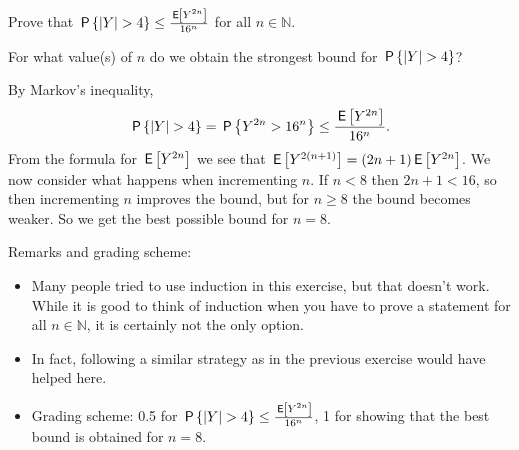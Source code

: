 \begin{exercise}[1.5]
Prove that $\P{|Y| > 4} \leq \frac{\E{Y^{2n}}}{16^n}$ for all $n \in \mathbb N$. 

For what value(s) of $n$ do we obtain the strongest bound for $\P{|Y| > 4}$?  \\
\begin{solution}
 By Markov's inequality,
\begin{equation*}
\P{|Y| > 4} = \P{Y^{2n} > 16^n} \leq \frac{\E{Y^{2n}}}{16^n}.
\end{equation*}
From the formula for $\E{Y^{2n}}$ we see that $\E{Y^{2(n+1)}} = (2n+1)\E{Y^{2n}}$. We now consider what happens when incrementing $n$. If $n < 8$ then $2n+1 < 16$, so then incrementing $n$ improves the bound, but for $n \geq 8$ the bound becomes weaker. So we get the best possible bound for $n=8$.

\noindent Remarks and grading scheme:
\begin{itemize}
\item Many people tried to use induction in this exercise, but that doesn't work. While it is good to think of induction when you have to prove a statement for all $n \in \mathbb N$, it is certainly not the only option. 
\item In fact, following a similar strategy as in the previous exercise would have helped here. 
\item Grading scheme: 0.5 for $\P{|Y| > 4} \leq \frac{\E{Y^{2n}}}{16^n}$, 1 for showing that the best bound is obtained for $n=8$. 
\end{itemize}
\end{solution}
\end{exercise}


